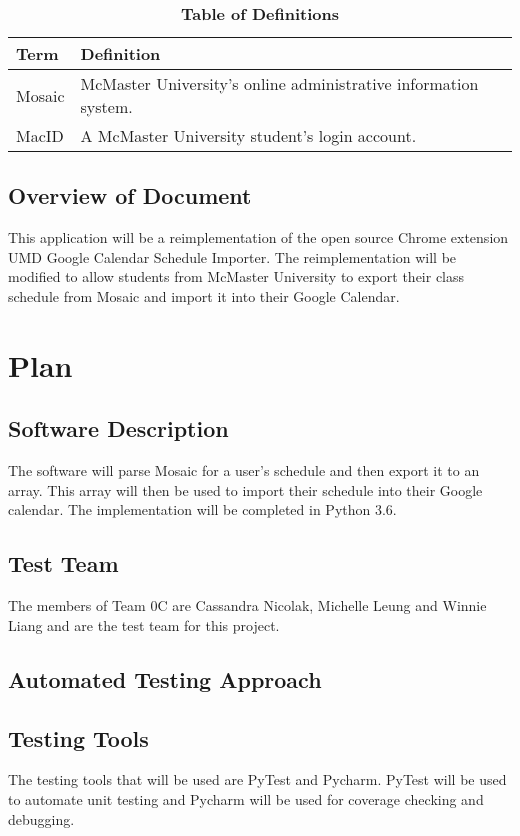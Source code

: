 \documentclass[12pt, titlepage]{article}
\begin{document}
\begin{table}[!htbp]
\caption{\textbf{Table of Definitions}} \label{Table}

\begin{tabularx}{\textwidth}{p{3cm}X}
\toprule
\textbf{Term} & \textbf{Definition}\\
\midrule
Mosaic & McMaster University's online administrative information system.\\
MacID & A McMaster University student's login account.\\
\bottomrule
\end{tabularx}

\end{table}	

\subsection{Overview of Document}
This application will be a reimplementation of the open source Chrome extension UMD Google Calendar Schedule Importer. The reimplementation will be modified to allow students from McMaster University to export their class schedule from Mosaic and import it into their Google Calendar.
\section{Plan}
	
\subsection{Software Description}
The software will parse Mosaic for a user's schedule and then export it to an array. This array will then be used to import their schedule into their Google calendar. The implementation will be completed in Python 3.6.

\subsection{Test Team}
The members of Team 0C are Cassandra Nicolak, Michelle Leung and Winnie Liang and are the test team for this project.
\subsection{Automated Testing Approach}

\subsection{Testing Tools}
The testing tools that will be used are PyTest and Pycharm. PyTest will be used to automate unit testing and Pycharm will be used for coverage checking and debugging.
\end{document}
